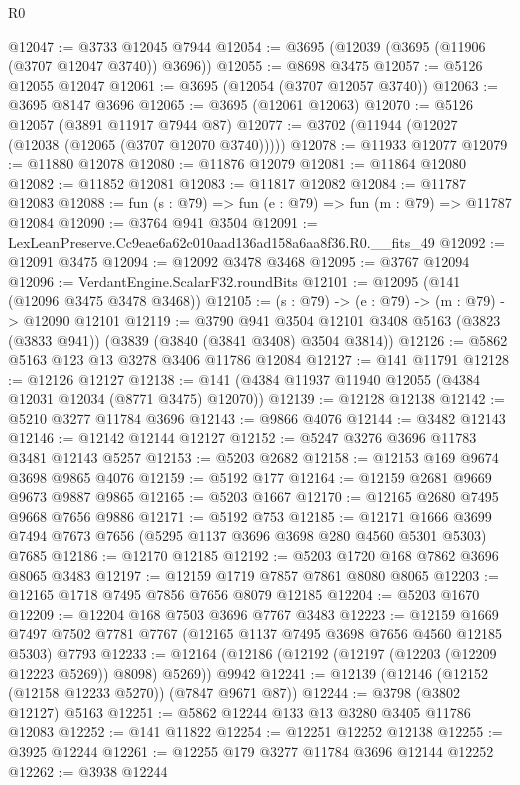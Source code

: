 \begin{lexlean}{R0}
\begin{coremodule}
@12047 := @3733 @12045 @7944
@12054 := @3695 (@12039 (@3695 (@11906 (@3707 @12047 @3740)) @3696))
@12055 := @8698 @3475
@12057 := @5126 @12055 @12047
@12061 := @3695 (@12054 (@3707 @12057 @3740))
@12063 := @3695 @8147 @3696
@12065 := @3695 (@12061 @12063)
@12070 := @5126 @12057 (@3891 @11917 @7944 @87)
@12077 := @3702 (@11944 (@12027 (@12038 (@12065 (@3707 @12070 @3740)))))
@12078 := @11933 @12077
@12079 := @11880 @12078
@12080 := @11876 @12079
@12081 := @11864 @12080
@12082 := @11852 @12081
@12083 := @11817 @12082
@12084 := @11787 @12083
@12088 := fun (s : @79) => fun (e : @79) => fun (m : @79) => @11787 @12084
@12090 := @3764 @941 @3504
@12091 := LexLeanPreserve.Cc9eae6a62c010aad136ad158a6aa8f36.R0.__fits_49
@12092 := @12091 @3475
@12094 := @12092 @3478 @3468
@12095 := @3767 @12094
@12096 := VerdantEngine.ScalarF32.roundBits
@12101 := @12095 (@141 (@12096 @3475 @3478 @3468))
@12105 := (s : @79) -> (e : @79) -> (m : @79) -> @12090 @12101
@12119 := @3790
    @941
    @3504
    @12101
    @3408
    @5163
    (@3823 (@3833 @941))
    (@3839 (@3840 (@3841 @3408) @3504 @3814))
@12126 := @5862 @5163 @123 @13 @3278 @3406 @11786 @12084
@12127 := @141 @11791
@12128 := @12126 @12127
@12138 := @141 (@4384 @11937 @11940 @12055 (@4384 @12031 @12034 (@8771 @3475) @12070))
@12139 := @12128 @12138
@12142 := @5210 @3277 @11784 @3696
@12143 := @9866 @4076
@12144 := @3482 @12143
@12146 := @12142 @12144 @12127
@12152 := @5247 @3276 @3696 @11783 @3481 @12143 @5257
@12153 := @5203 @2682
@12158 := @12153 @169 @9674 @3698 @9865 @4076
@12159 := @5192 @177
@12164 := @12159 @2681 @9669 @9673 @9887 @9865
@12165 := @5203 @1667
@12170 := @12165 @2680 @7495 @9668 @7656 @9886
@12171 := @5192 @753
@12185 := @12171
    @1666
    @3699
    @7494
    @7673
    @7656
    (@5295 @1137 @3696 @3698 @280 @4560 @5301 @5303)
    @7685
@12186 := @12170 @12185
@12192 := @5203 @1720 @168 @7862 @3696 @8065 @3483
@12197 := @12159 @1719 @7857 @7861 @8080 @8065
@12203 := @12165 @1718 @7495 @7856 @7656 @8079 @12185
@12204 := @5203 @1670
@12209 := @12204 @168 @7503 @3696 @7767 @3483
@12223 := @12159
    @1669
    @7497
    @7502
    @7781
    @7767
    (@12165 @1137 @7495 @3698 @7656 @4560 @12185 @5303)
    @7793
@12233 := @12164 (@12186 (@12192 (@12197 (@12203 (@12209 @12223 @5269)) @8098) @5269)) @9942
@12241 := @12139 (@12146 (@12152 (@12158 @12233 @5270)) (@7847 @9671 @87))
@12244 := @3798 (@3802 @12127) @5163
@12251 := @5862 @12244 @133 @13 @3280 @3405 @11786 @12083
@12252 := @141 @11822
@12254 := @12251 @12252 @12138
@12255 := @3925 @12244
@12261 := @12255 @179 @3277 @11784 @3696 @12144 @12252
@12262 := @3938 @12244

\end{coremodule}
\end{lexlean}
